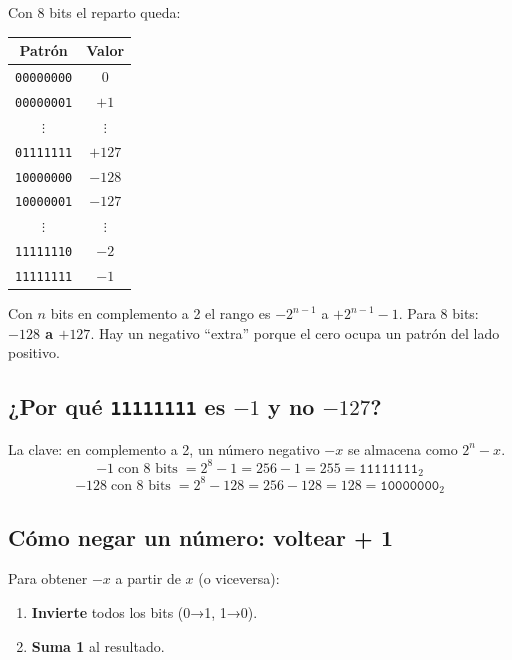 \documentclass[12pt, oneside]{article}
\begin{document}
Con 8 bits el reparto queda:

\begin{center}
\begin{tabular}{cc}
  \toprule
  \textbf{Patrón} & \textbf{Valor} \\
  \midrule
  \texttt{00000000} & $0$ \\
  \texttt{00000001} & $+1$ \\
  $\vdots$ & $\vdots$ \\
  \texttt{01111111} & $+127$ \\
  \texttt{10000000} & $-128$ \\
  \texttt{10000001} & $-127$ \\
  $\vdots$ & $\vdots$ \\
  \texttt{11111110} & $-2$ \\
  \texttt{11111111} & $-1$ \\
  \bottomrule
\end{tabular}
\end{center}

\begin{recuerda}
  Con $n$ bits en complemento a 2 el rango es $-2^{n-1}$ a $+2^{n-1}-1$.
  Para 8 bits: \textbf{$-128$ a $+127$}. Hay un negativo ``extra''
  porque el cero ocupa un patrón del lado positivo.
\end{recuerda}

\subsection{¿Por qué \texttt{11111111} es $-1$ y no $-127$?}

La clave: en complemento a 2, un número negativo $-x$ se almacena como
$2^n - x$.
\[
  -1 \;\text{con 8 bits}\; = 2^8 - 1 = 256 - 1 = 255 = \texttt{11111111}_2
\]
\[
  -128 \;\text{con 8 bits}\; = 2^8 - 128 = 256 - 128 = 128 = \texttt{10000000}_2
\]

\subsection{Cómo negar un número: voltear + 1}

Para obtener $-x$ a partir de $x$ (o viceversa):
\begin{enumerate}
  \item \textbf{Invierte} todos los bits (0→1, 1→0).
  \item \textbf{Suma 1} al resultado.
\end{enumerate}
\end{document}
